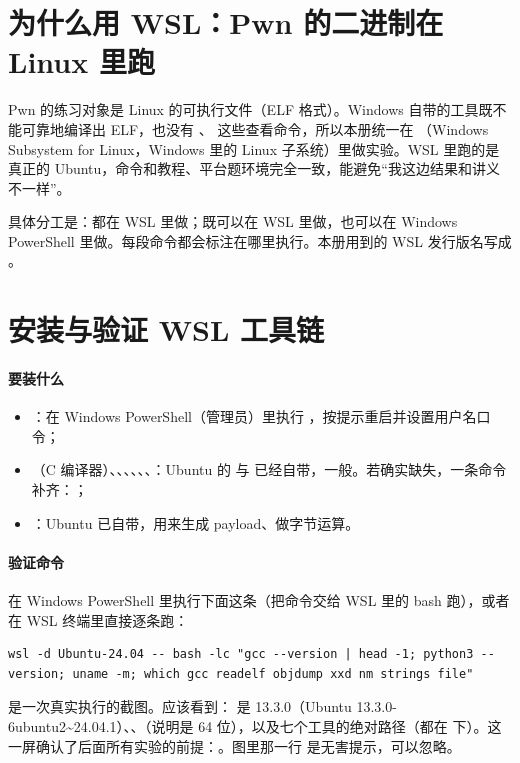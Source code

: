 \documentclass[UTF8,12pt,oneside]{ctexbook}
\begin{document}

\section{为什么用 WSL：Pwn 的二进制在 Linux 里跑}
Pwn 的练习对象是 Linux 的可执行文件（ELF 格式）。Windows 自带的工具既不能可靠地编译出 ELF，也没有 、 这些查看命令，所以本册统一在 （Windows Subsystem for Linux，Windows 里的 Linux 子系统）里做实验。WSL 里跑的是真正的 Ubuntu，命令和教程、平台题环境完全一致，能避免“我这边结果和讲义不一样”。

具体分工是：都在 WSL 里做；既可以在 WSL 里做，也可以在 Windows PowerShell 里做。每段命令都会标注在哪里执行。本册用到的 WSL 发行版名写成 。

\section{安装与验证 WSL 工具链}
\paragraph{要装什么}
\begin{itemize}
\item {}：在 Windows PowerShell（管理员）里执行 ，按提示重启并设置用户名口令；
\item {}（C 编译器）、、、、、、：Ubuntu 的  与  已经自带，一般。若确实缺失，一条命令补齐：；
\item {}：Ubuntu 已自带，用来生成 payload、做字节运算。
\end{itemize}

\paragraph{验证命令}在 Windows PowerShell 里执行下面这条（把命令交给 WSL 里的 bash 跑），或者在 WSL 终端里直接逐条跑：
\begin{lstlisting}
wsl -d Ubuntu-24.04 -- bash -lc "gcc --version | head -1; python3 --version; uname -m; which gcc readelf objdump xxd nm strings file"
\end{lstlisting}
 是一次真实执行的截图。应该看到： 是 13.3.0（Ubuntu 13.3.0-6ubuntu2\textasciitilde24.04.1）、、（说明是 64 位），以及七个工具的绝对路径（都在  下）。这一屏确认了后面所有实验的前提：。图里那一行  是无害提示，可以忽略。
\end{document}
